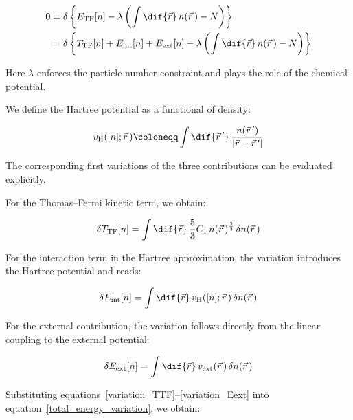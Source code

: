 \begin{equation}
\begin{aligned}
    0 &= \delta\left\{E_\mathrm{TF}[n]-\lambda\left(\int\dif{\vec{r}}\,n(\vec{r}\,)-N\right)\right\}\\
    &= \delta\left\{T_\mathrm{TF}[n]+E_\mathrm{int}[n]+E_\mathrm{ext}[n]-\lambda\left(\int\dif{\vec{r}}\,n(\vec{r}\,)-N\right)\right\}
\end{aligned}
\label{total_energy_variation}
\end{equation}

Here $\lambda$ enforces the particle number constraint and plays the role of the chemical potential.

We define the Hartree potential as a functional of density:

\begin{equation}
    v_\mathrm{H}([n];\vec{r}\,)\coloneqq\int\dif{\vec{r}\,'}\,\frac{n(\vec{r}\,')}{|\vec{r}-\vec{r}\,'|}
\label{Hartree_potential_definition}
\end{equation}

The corresponding first variations of the three contributions can be evaluated explicitly.

For the Thomas--Fermi kinetic term, we obtain:

\begin{equation}
    \delta T_\mathrm{TF}[n]
    = \int\dif{\vec{r}}\,\frac{5}{3}C_1\,n(\vec{r}\,)^{\frac{2}{3}}\,\delta n(\vec{r}\,)
\label{variation_TTF}
\end{equation}

For the interaction term in the Hartree approximation, the variation introduces the Hartree potential and reads:

\begin{equation}
    \delta E_\mathrm{int}[n]
    = \int\dif{\vec{r}}\,v_\mathrm{H}([n];\vec{r}\,)\,\delta n(\vec{r}\,)
\label{variation_Eint}
\end{equation}

For the external contribution, the variation follows directly from the linear coupling to the external potential:

\begin{equation}
    \delta E_\mathrm{ext}[n]
    = \int\dif{\vec{r}}\,v_\mathrm{ext}(\vec{r}\,)\,\delta n(\vec{r}\,)
\label{variation_Eext}
\end{equation}

Substituting equations~\eqref{variation_TTF}--\eqref{variation_Eext} into equation~\eqref{total_energy_variation}, we obtain:

